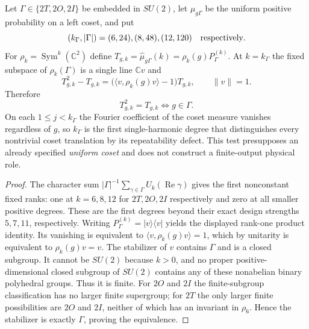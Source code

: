 \documentclass[12pt,a4paper]{article}
\begin{document}
\begin{theorem}
\label{p2a:thm:v274-first-leaked-harmonic-coset}
Let $\Gamma\in\{2T,2O,2I\}$ be embedded in $SU(2)$, let
$\mu_{g\Gamma}$ be the uniform positive probability on a left coset,
and put
\[
 (k_\Gamma,|\Gamma|)=(6,24),(8,48),(12,120)
 \quad\hbox{respectively}.
\]
For $\rho_k=\operatorname{Sym}^k(\mathbb C^2)$ define
$T_{g,k}=\widehat\mu_{g\Gamma}(k)=\rho_k(g)P_\Gamma^{(k)}$.
At $k=k_\Gamma$ the fixed subspace of $\rho_k(\Gamma)$ is a
single line $\mathbb Cv$ and
\[
 \boxed{T_{g,k}^2-T_{g,k}
    =\bigl(\langle v,\rho_k(g)v\rangle-1\bigr)T_{g,k},}
 \qquad\|v\|=1.
\]
Therefore
\[
 \boxed{T_{g,k}^2=T_{g,k}\iff g\in\Gamma.}
\]
On each $1\le j<k_\Gamma$ the Fourier coefficient of the coset
measure vanishes regardless of $g$, so $k_\Gamma$ is the first
single-harmonic degree that distinguishes every nontrivial coset
translation by its repeatability defect. This test presupposes an
already specified \emph{uniform coset} and does not construct a
finite-output physical role.
\end{theorem}
\begin{proof}
The character sum $|\Gamma|^{-1}\sum_{\gamma\in\Gamma}
U_k(\operatorname{Re}\gamma)$ gives the first nonconstant fixed
ranks: one at $k=6,8,12$ for $2T,2O,2I$ respectively and zero at
all smaller positive degrees. These are the first degrees beyond
their exact design strengths $5,7,11$, respectively.
Writing $P_\Gamma^{(k)}=|v\rangle\langle v|$ yields the displayed
rank-one product identity. Its vanishing is equivalent to
$\langle v,\rho_k(g)v\rangle=1$, which by unitarity is equivalent
to $\rho_k(g)v=v$. The stabilizer of $v$ contains $\Gamma$ and is
a closed subgroup. It cannot be $SU(2)$ because $k>0$, and no
proper positive-dimensional closed subgroup of $SU(2)$ contains any
of these nonabelian binary polyhedral groups. Thus it is finite.
For $2O$ and $2I$ the finite-subgroup classification has no larger
finite supergroup; for $2T$ the only larger finite possibilities are
$2O$ and $2I$, neither of which has an invariant in $\rho_6$.
Hence the stabilizer is exactly $\Gamma$, proving the equivalence.
\end{proof}
\end{document}
